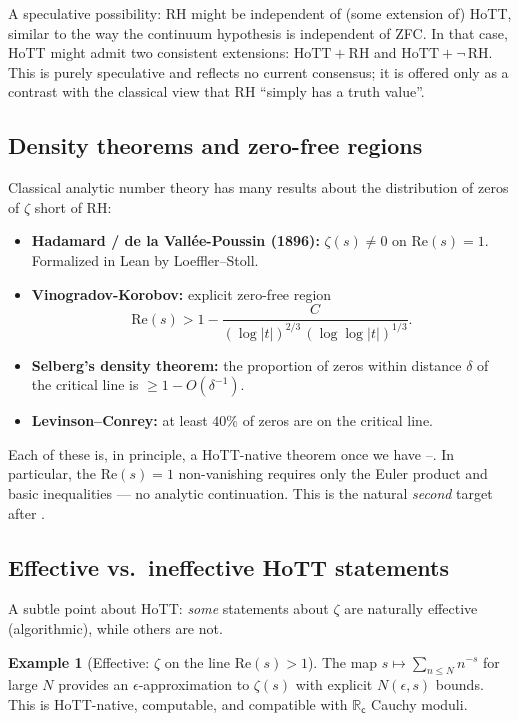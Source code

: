 \documentclass[12pt]{article}
\theoremstyle{definition}
\newtheorem{example}[theorem]{Example}
\theoremstyle{remark}
\newcommand{\R}{\mathbb{R}}
\newcommand{\Rc}{\R_{\mathsf{c}}}
\begin{document}
A speculative possibility: $\mathrm{RH}$ might be independent of (some
extension of) HoTT, similar to the way the continuum hypothesis is
independent of ZFC. In that case, HoTT might admit two consistent
extensions: $\mathrm{HoTT} + \mathrm{RH}$ and $\mathrm{HoTT} + \neg\,\mathrm{RH}$.
This is purely speculative and reflects no current consensus; it is offered
only as a contrast with the classical view that RH ``simply has a truth value''.

\subsection{Density theorems and zero-free regions}\label{subsec:zerofree}

Classical analytic number theory has many results about the distribution of
zeros of $\zeta$ short of RH:
\begin{itemize}
\item \textbf{Hadamard / de la Vall\'ee-Poussin (1896):} $\zeta(s) \neq 0$
on $\mathrm{Re}(s) = 1$. Formalized in Lean by Loeffler--Stoll.
\item \textbf{Vinogradov-Korobov:} explicit zero-free region
\[
\mathrm{Re}(s) > 1 - \frac{C}{(\log|t|)^{2/3}\,(\log\log|t|)^{1/3}}.
\]
\item \textbf{Selberg's density theorem:} the proportion of zeros within
distance $\delta$ of the critical line is $\geq 1 - O(\delta^{-1})$.
\item \textbf{Levinson--Conrey:} at least $40\%$ of zeros are on the
critical line.
\end{itemize}

Each of these is, in principle, a HoTT-native theorem once we have
--. In particular, the $\mathrm{Re}(s) = 1$
non-vanishing requires only the Euler product and basic
inequalities — no analytic continuation. This is the natural \emph{second}
target after .

\subsection{Effective vs.\ ineffective HoTT statements}\label{subsec:effective}

A subtle point about HoTT: \emph{some} statements about $\zeta$ are
naturally effective (algorithmic), while others are not.

\begin{example}[Effective: $\zeta$ on the line $\mathrm{Re}(s) > 1$]
The map $s \mapsto \sum_{n \leq N} n^{-s}$ for large $N$ provides an
$\epsilon$-approximation to $\zeta(s)$ with explicit $N(\epsilon, s)$
bounds. This is HoTT-native, computable, and compatible with $\Rc$ Cauchy
moduli.
\end{example}
\end{document}
